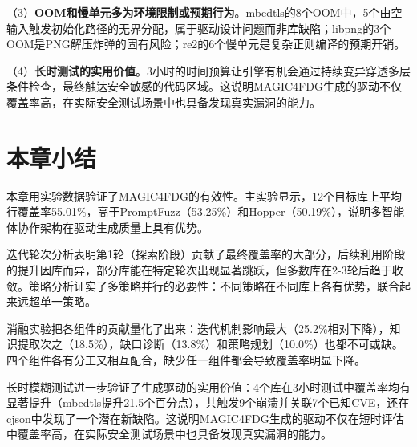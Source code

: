 （3）\textbf{OOM和慢单元多为环境限制或预期行为}。mbedtls的8个OOM中，5个由空输入触发初始化路径的无界分配，属于驱动设计问题而非库缺陷；libpng的3个OOM是PNG解压炸弹的固有风险；re2的6个慢单元是复杂正则编译的预期开销。

（4）\textbf{长时测试的实用价值}。3小时的时间预算让引擎有机会通过持续变异穿透多层条件检查，最终触达安全敏感的代码区域。这说明MAGIC4FDG生成的驱动不仅覆盖率高，在实际安全测试场景中也具备发现真实漏洞的能力。

\section{本章小结}

本章用实验数据验证了MAGIC4FDG的有效性。主实验显示，12个目标库上平均行覆盖率55.01\%，高于PromptFuzz（53.25\%）和Hopper（50.19\%），说明多智能体协作架构在驱动生成质量上具有优势。

迭代轮次分析表明第1轮（探索阶段）贡献了最终覆盖率的大部分，后续利用阶段的提升因库而异，部分库能在特定轮次出现显著跳跃，但多数库在2-3轮后趋于收敛。策略分析证实了多策略并行的必要性：不同策略在不同库上各有优势，联合起来远超单一策略。

消融实验把各组件的贡献量化了出来：迭代机制影响最大（25.2\%相对下降），知识提取次之（18.5\%），缺口诊断（13.8\%）和策略规划（10.0\%）也都不可或缺。四个组件各有分工又相互配合，缺少任一组件都会导致覆盖率明显下降。

长时模糊测试进一步验证了生成驱动的实用价值：4个库在3小时测试中覆盖率均有显著提升（mbedtls提升21.5个百分点），共触发9个崩溃并关联7个已知CVE，还在cjson中发现了一个潜在新缺陷。这说明MAGIC4FDG生成的驱动不仅在短时评估中覆盖率高，在实际安全测试场景中也具备发现真实漏洞的能力。
